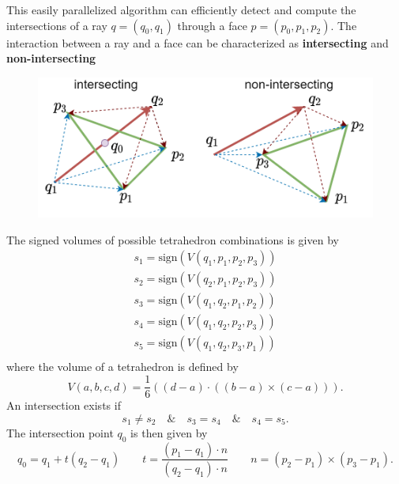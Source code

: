 This easily parallelized algorithm can efficiently detect and compute the intersections of a ray $q=(q_0, q_1)$ through a face $p=(p_0, p_1, p_2)$. The interaction between a ray and a face can be characterized as \textbf{intersecting} and \textbf{non-intersecting}
\begin{figure}
    \centering
    \includegraphics{figs/moller_trumbore.drawio.png}
\end{figure}

The signed volumes of possible tetrahedron combinations is given by
$$\begin{aligned}
    s_1 = \text{sign}(V(q_1, p_1, p_2, p_3))\\
    s_2 = \text{sign}(V(q_2, p_1, p_2, p_3))\\
    s_3 = \text{sign}(V(q_1, q_2, p_1, p_2))\\
    s_4 = \text{sign}(V(q_1, q_2, p_2, p_3))\\
    s_5 = \text{sign}(V(q_1, q_2, p_3, p_1))\\
\end{aligned}$$
where the volume of a tetrahedron is defined by
$$V(a, b, c, d) = \frac{1}{6} \left((d-a) \cdot ((b-a) \times (c-a))\right).$$
An intersection exists if 
\begin{equation}
    s_1 \neq s_2 \quad \& \quad s_3 = s_4 \quad \& \quad s_4 = s_5.
    \label{eq:moller}
\end{equation}
The intersection point $q_0$ is then given by
$$q_0 = q_1 + t (q_2-q_1) \qquad t = \frac{(p_1-q_1) \cdot n}{(q_2-q_1) \cdot n} \qquad n = (p_2-p_1) \times (p_3-p_1).$$



